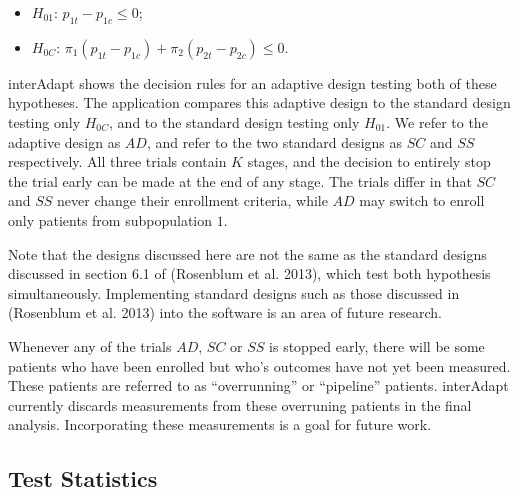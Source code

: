 \documentclass{article}
\newcommand{\interAdapt}{\textsf{interAdapt }}
\begin{document}
\begin{itemize}
\item $H_{01}$: $p_{1t}-p_{1c}≤0$;%
\item $H_{0C}$: $π_1(p_{1t}-p_{1c}) + π_2(p_{2t}-p_{2c}) ≤ 0$. %
\end{itemize}

\interAdapt shows the decision rules for an adaptive design testing both of these hypotheses. The application compares this adaptive design to the standard design testing only $H_{0C}$, and to the standard design testing only $H_{01}$. We refer to the adaptive design as $AD$, and refer to the two standard designs as $SC$ and $SS$ respectively. All three trials contain $K$ stages, and the decision to entirely stop the trial early can be made at the end of any stage. The trials differ in that $SC$ and $SS$ never change their enrollment criteria, while $AD$ may switch to enroll only patients from subpopulation $1$.

Note that the designs discussed here are not the same as the standard designs discussed in section 6.1 of (Rosenblum et al. 2013)\cite{Rosenblum2013AdaptMISTIE}, which test both hypothesis simultaneously. Implementing standard designs such as those discussed in (Rosenblum et al. 2013)\cite{Rosenblum2013AdaptMISTIE} into the software is an area of future research.

Whenever any of the trials $AD$, $SC$ or $SS$ is stopped early, there will be some patients who have been enrolled but who’s outcomes have not yet been measured. These patients are referred to as “overrunning” or “pipeline” patients. \interAdapt currently discards measurements from these overruning patients in the final analysis. Incorporating these measurements is a goal for future work.



\subsection*{Test Statistics}
\end{document}
